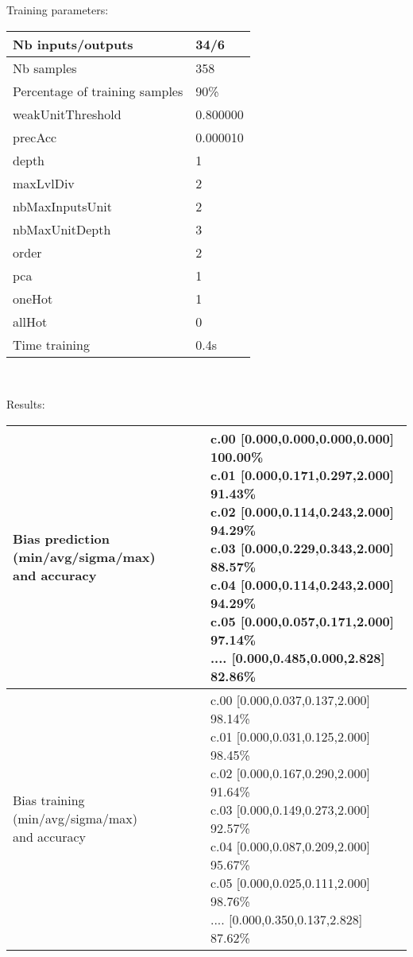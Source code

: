 Training parameters:\\
\begin{center}
\begin{tabular}{|l|l|}
\hline
Nb inputs/outputs&34/6\\
\hline
Nb samples&358\\
\hline
Percentage of training samples&90\%\\
\hline
weakUnitThreshold&0.800000\\
\hline
precAcc&0.000010\\
\hline
depth&1\\
\hline
maxLvlDiv&2\\
\hline
nbMaxInputsUnit&2\\
\hline
nbMaxUnitDepth&3\\
\hline
order&2\\
\hline
pca&1\\
\hline
oneHot&1\\
\hline
allHot&0\\
\hline
Time training&0.4s\\
\hline
\end{tabular}\\
\end{center}\newline
Results:
\begin{center}
\begin{tabular}{|l|l|}
\hline
\makecell{Bias prediction (min/avg/sigma/max)\\and accuracy}&\makecell{c.00 [0.000,0.000,0.000,0.000] 100.00\%\\
c.01 [0.000,0.171,0.297,2.000] 91.43\%\\
c.02 [0.000,0.114,0.243,2.000] 94.29\%\\
c.03 [0.000,0.229,0.343,2.000] 88.57\%\\
c.04 [0.000,0.114,0.243,2.000] 94.29\%\\
c.05 [0.000,0.057,0.171,2.000] 97.14\%\\
.... [0.000,0.485,0.000,2.828] 82.86\%\\
}\\

\hline
\makecell{Bias training (min/avg/sigma/max)\\and accuracy}&\makecell{c.00 [0.000,0.037,0.137,2.000] 98.14\%\\
c.01 [0.000,0.031,0.125,2.000] 98.45\%\\
c.02 [0.000,0.167,0.290,2.000] 91.64\%\\
c.03 [0.000,0.149,0.273,2.000] 92.57\%\\
c.04 [0.000,0.087,0.209,2.000] 95.67\%\\
c.05 [0.000,0.025,0.111,2.000] 98.76\%\\
.... [0.000,0.350,0.137,2.828] 87.62\%\\
}\\
\hline
\end{tabular}\
\end{center}
